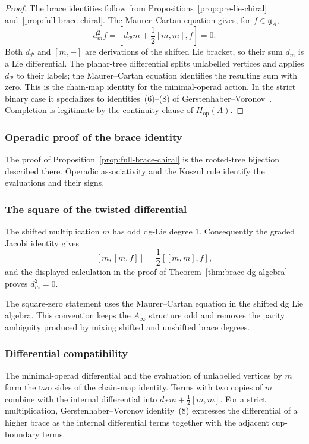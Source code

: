 \begin{proof}
The brace identities follow from
Propositions~\ref{prop:pre-lie-chiral}
and~\ref{prop:full-brace-chiral}.  The Maurer--Cartan equation gives,
for \(f\in\mathfrak g_A\),
\[
 d_m^2f
 =
 \left[d_{\mathcal P}m+\frac12[m,m],f\right]
 =0.
\]
Both \(d_{\mathcal P}\) and \([m,-]\) are derivations of the shifted
Lie bracket, so their sum \(d_m\) is a Lie differential.  The
planar-tree differential splits
unlabelled vertices and applies \(d_{\mathcal P}\) to their labels;
the Maurer--Cartan equation identifies the resulting sum with zero.
This is the chain-map identity for the minimal-operad action.  In the
strict binary case it specializes to identities~\textup{(6)--(8)} of
Gerstenhaber--Voronov~\cite{GV95}.  Completion is legitimate by the
continuity clause of \(H_{\mathrm{op}}(A)\).
\end{proof}

\subsubsection{Operadic proof of the brace identity}
\label{subsubsec:proof-brace-identity}
The proof of Proposition~\ref{prop:full-brace-chiral} is the rooted-tree
bijection described there.  Operadic associativity and the Koszul rule
identify the evaluations and their signs.

\subsubsection{The square of the twisted differential}
\label{subsubsec:proof-delta-squared}
The shifted multiplication \(m\) has odd dg-Lie degree \(1\).
Consequently the graded Jacobi identity gives
\[
 [m,[m,f]]=\frac12[[m,m],f],
\]
and the displayed calculation in the proof of
Theorem~\ref{thm:brace-dg-algebra} proves \(d_m^2=0\).

\begin{remark}
\label{rem:half-jacobi}
The square-zero statement uses the Maurer--Cartan equation in the
shifted dg Lie algebra.  This convention keeps the \(A_\infty\)
structure odd and removes the parity ambiguity produced by mixing
shifted and unshifted brace degrees.
\end{remark}

\subsubsection{Differential compatibility}
\label{subsubsec:proof-diff-compat}
The minimal-operad differential and the evaluation of unlabelled
vertices by \(m\) form the two sides of the chain-map identity.  Terms
with two copies of \(m\) combine with the internal differential into
\(d_{\mathcal P}m+\frac12[m,m]\).  For a strict multiplication,
Gerstenhaber--Voronov identity~\textup{(8)} expresses the differential
of a higher brace as the internal differential terms together with
the adjacent cup-boundary terms.

